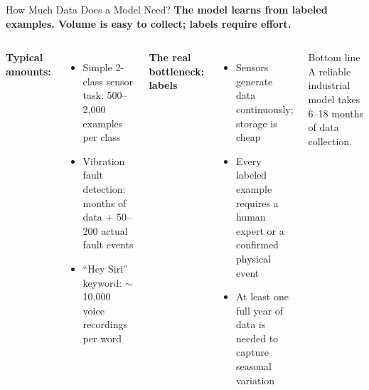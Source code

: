 \documentclass[aspectratio=169,11pt]{beamer}
\begin{document}
\begin{frame}{How Much Data Does a Model Need?}
    \small
    \textbf{The model learns from labeled examples. Volume is easy to collect; labels require effort.}

    \vspace{0.3cm}
    \begin{columns}
        \textbf{Typical amounts:}
        \begin{itemize}\setlength{\itemsep}{8pt}
            \item Simple 2-class sensor task: 500--2{,}000 examples per class
            \item Vibration fault detection: months of data + 50--200 actual fault events
            \item ``Hey Siri'' keyword: $\sim$10{,}000 voice recordings per word
        \end{itemize}

        \textbf{The real bottleneck: labels}
        \begin{itemize}\setlength{\itemsep}{8pt}
            \item Sensors generate data continuously; storage is cheap
            \item Every labeled example requires a human expert or a confirmed physical event
            \item At least one full year of data is needed to capture seasonal variation
        \end{itemize}

        \vspace{0.2cm}
        \begin{alertblock}{Bottom line}
            A reliable industrial model takes 6--18 months of data collection.
        \end{alertblock}
    \end{columns}
\end{frame}
\end{document}
